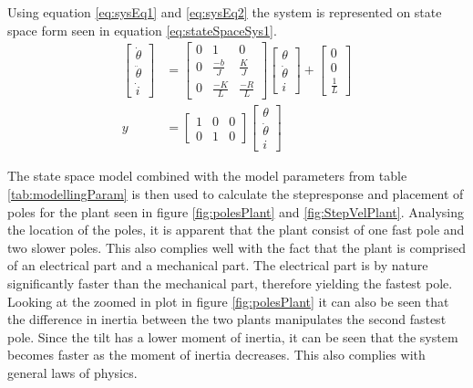 \documentclass[../../main.tex]{subfiles}
\begin{document}
Using equation \ref{eq:sysEq1} and \ref{eq:sysEq2} the system is represented on state space form seen in equation \ref{eq:stateSpaceSys1}.
\begin{equation}\label{eq:stateSpaceSys1}
\begin{split}
\begin{bmatrix}
\dot{\theta}\\
\ddot{\theta}\\
\dot{i}
\end{bmatrix} &=
\begin{bmatrix}
0 & 1 & 0 \\
0 & \frac{-b}{J} & \frac{K}{J}\\
0 & \frac{-K}{L} & \frac{-R}{L}
\end{bmatrix}
\begin{bmatrix}
\theta\\
\dot{\theta}\\
i
\end{bmatrix}
+ 
\begin{bmatrix}
0 \\
0 \\
\frac{1}{L}
\end{bmatrix} \\
    y &= 
    \begin{bmatrix}
    1 & 0 & 0\\
    0 & 1 & 0
    \end{bmatrix}
    \begin{bmatrix}
    \theta\\
    \dot{\theta}\\
    i
    \end{bmatrix}
    \end{split}
\end{equation}

The state space model combined with the model parameters from table \ref{tab:modellingParam} is then used to calculate the stepresponse and placement of poles for the plant seen in figure \ref{fig:polesPlant} and \ref{fig:StepVelPlant}. Analysing the location of the poles, it is apparent that the plant consist of one fast pole and two slower poles. This also complies well with the fact that the plant is comprised of an electrical part and a mechanical part. The electrical part is by nature significantly faster than the mechanical part, therefore yielding the fastest pole. Looking at the zoomed in plot in figure \ref{fig:polesPlant} it can also be seen that the difference in inertia between the two plants manipulates the second fastest pole. Since the tilt has a lower moment of inertia, it can be seen that the system becomes faster as the moment of inertia decreases. This also complies with general laws of physics. 
\end{document}
